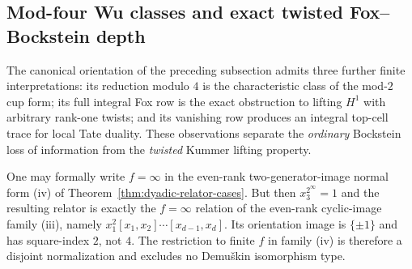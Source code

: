 \subsection{Mod-four Wu classes and exact twisted Fox--Bockstein depth}
\label{subsec:dyadic-fox-wu-tate}

The canonical orientation of the preceding subsection admits three further
finite interpretations: its reduction modulo $4$ is the characteristic
class of the mod-$2$ cup form; its full integral Fox row is the exact
obstruction to lifting $H^1$ with arbitrary rank-one twists; and its
vanishing row produces an integral top-cell trace for local Tate
duality.  These observations separate the \emph{ordinary} Bockstein
loss of information from the \emph{twisted} Kummer lifting property.

\begin{remark}[Disjointness at the even $q=2$ boundary]
\label{rem:dyadic-even-infinity-boundary}
One may formally write $f=\infty$ in the even-rank
two-generator-image normal form (iv) of
Theorem~\ref{thm:dyadic-relator-cases}.
But then $x_3^{2^\infty}=1$ and the resulting
relator is exactly the $f=\infty$ relation of
the even-rank cyclic-image family (iii),
namely $x_1^2[x_1,x_2]\cdots[x_{d-1},x_d]$.
Its orientation image is $\{\pm1\}$ and
has square-index $2$, not $4$.
The restriction to finite $f$ in family (iv)
is therefore a disjoint normalization and
excludes no Demu\v{s}kin isomorphism type.
\end{remark}

